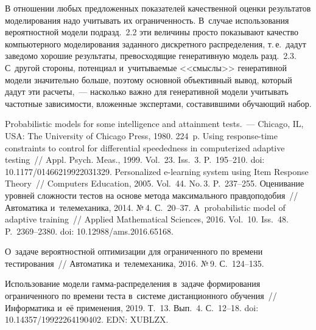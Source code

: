 \begin{multicols}{2}
  В отношении любых предложенных показателей качественной оценки 
результатов моделирования надо учитывать их ограниченность. В~случае 
использования вероятностной модели подразд.~2.2 эти величины просто 
показывают качество компьютерного моделирования заданного дискретного 
распределения, т.\,е.\ дадут заведомо хорошие результаты, превосходящие 
генеративную модель разд.~2.3. С~другой стороны, потенциал 
и~учитываемые <<смыс\-лы>> генеративной модели значительно больше, 
поэтому основной объективный вывод, который дадут эти расчеты,~--- 
насколько важно для генеративной модели учитывать частотные 
зависимости, вложенные экспертами, составившими обуча\-ющий набор.
  
{\small\frenchspacing
 { %
 \begin{thebibliography}{99}
 
 Probabilistic models for some intelligence and attainment tests.~--- Chicago, IL, 
USA: The University of Chicago Press, 1980. 224~p.
 Using response-time 
constraints to control for differential speededness in computerized adaptive testing~// Appl. 
Psych. Meas., 1999. Vol.~23. Iss.~3. P.~195--210. doi: 10.1177/01466219922031329.
 Personalized \mbox{e-learning} system using Item Response 
Theory~// Computers  Education, 2005. Vol.~44. No.\,3. P.~237--255.
 Оценивание уровней сложности тестов на основе 
метода максимального правдоподобия~// Автоматика и~телемеханика, 2014. №\,4.  
С.~20--37.
 A~probabilistic model of adaptive training~// Applied Mathematical Sciences, 2016. 
Vol.~10. Iss.~48. P.~2369--2380. doi: 10.12988/ams.2016.65168.


 О~задаче вероятностной оптимизации для 
ограниченного по времени тестирования~// Автоматика и~телемеханика, 2016. №\,9. 
С.~124--135.

 Использование модели  
гам\-ма-рас\-пре\-де\-ле\-ния в~задаче формирования ограниченного по времени теста 
в~сис\-те\-ме дистанционного обуче\-ния~// Информатика и~её применения, 2019. Т.~13. 
Вып.~4. С.~12--18. doi: 10.14357/19922264190402. EDN: XUBLZX.


\end{thebibliography}}}
\end{multicols}
